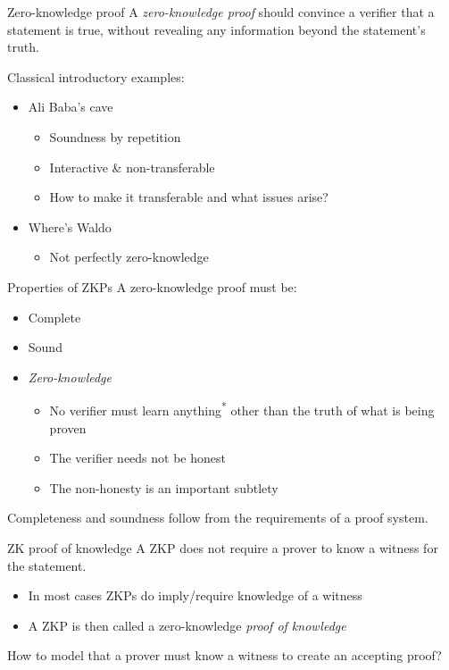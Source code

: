\begin{frame}{Zero-knowledge proof}
  A \emph{zero-knowledge proof} should convince a verifier that a statement is true, without revealing any information beyond the statement's truth.

  \vspace*{1em}

  \pause
  Classical introductory examples:
  \begin{itemize}[<+(1)->]
    \item Ali Baba's cave
    \begin{itemize}
      \item Soundness by repetition
      \item Interactive \& non-transferable
      \item How to make it transferable and what issues arise?
    \end{itemize}
    \item Where's Waldo
    \begin{itemize}
      \item Not perfectly zero-knowledge
    \end{itemize}
  \end{itemize}
\end{frame}

\begin{frame}{Properties of ZKPs}
  A zero-knowledge proof must be:
  \begin{itemize}[<+(1)->]
    \item Complete
    \item Sound
    \item \emph{Zero-knowledge}
    \begin{itemize}
      \item No verifier must learn anything\textsuperscript{*} other than the truth of what is being proven
      \item The verifier needs not be honest
      \item The non-honesty is an important subtlety
    \end{itemize}
  \end{itemize}

  \pause
  Completeness and soundness follow from the requirements of a proof system.
\end{frame}

\begin{frame}{ZK proof of knowledge}
  A ZKP does not require a prover to know a witness for the statement.
  \begin{itemize}[<+(1)->]
    \item In most cases ZKPs do imply/require knowledge of a witness
    \item A ZKP is then called a zero-knowledge \emph{proof of knowledge}
  \end{itemize}

  \vspace*{1em}

  \pause
  How to model that a prover must know a witness to create an accepting proof?
\end{frame}

